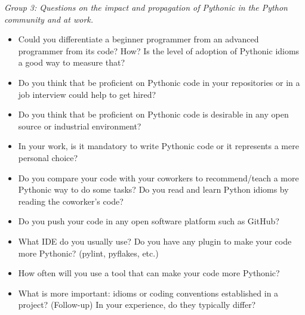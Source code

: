 \documentclass[a4paper]{article}
\begin{document}
\textit{Group 3: Questions on the impact and propagation of Pythonic in the Python community and at work.}
\begin{itemize}
  \item Could you differentiate a beginner programmer from an advanced programmer from its code? How? Is the level of adoption of Pythonic idioms a good way to measure that?
  \item Do you think that be proficient on Pythonic code in your repositories or in a job interview could help to get hired?
  \item Do you think that be proficient on Pythonic code is desirable in any open source or industrial environment?
  \item In your work, is it mandatory to write Pythonic code or it represents a mere personal choice?
  \item Do you compare your code with your coworkers to recommend/teach a more Pythonic way to do some tasks? Do you read and learn Python idioms by reading the coworker's code?
  \item Do you push your code in any open software platform such as GitHub? 
  \item What IDE do you usually use? Do you have any plugin to make your code more Pythonic? (pylint, pyflakes, etc.)
  \item How often will you use a tool that can make your code more Pythonic?
  \item What is more important: idioms or coding conventions established in a project?
  (Follow-up) In your experience, do they typically differ?
\end{itemize}
\end{document}
